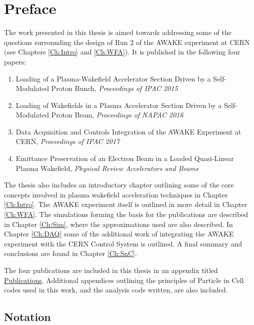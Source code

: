\chapter*{Preface}

The work presented in this thesis is aimed towards addressing some of the questions surrounding the design of Run 2 of the AWAKE experiment at CERN (see Chapters \ref{Ch:Intro} and \ref{Ch:WFA}). It is published in the following four papers:

\begin{enumerate}[I]
    \item Loading of a Plasma-Wakefield Accelerator Section Driven by a Self-Modulated Proton Bunch, \emph{Proceedings of IPAC 2015} \cite{berglyd_olsen:2015}
    \item Loading of Wakefields in a Plasma Accelerator Section Driven by a Self-Modulated Proton Beam, \emph{Proceedings of NAPAC 2016} \cite{berglyd_olsen:2016}
    \item Data Acquisition and Controls Integration of the AWAKE Experiment at CERN, \emph{Proceedings of IPAC 2017} \cite{berglyd_olsen:2017}
    \item Emittance Preservation of an Electron Beam in a Loaded Quasi-Linear Plasma Wakefield, \emph{Physical Review Accelerators and Beams} \cite{berglyd_olsen:2017-1}
\end{enumerate}

The thesis also includes an introductory chapter outlining some of the core concepts involved in plasma wakefield acceleration techniques in Chapter \ref{Ch:Intro}. The AWAKE experiment itself is outlined in more detail in Chapter \ref{Ch:WFA}. The simulations forming the basis for the publications are described in Chapter \ref{Ch:Sim}, where the approximations used are also described. In Chapter \ref{Ch:DAQ} some of the additional work of integrating the AWAKE experiment with the CERN Control System is outlined. A final summary and conclusions are found in Chapter \ref{Ch:SnC}.

\noindent The four publications are included in this thesis in an appendix titled \hyperref[A:Pub]{Publications}. Additional appendices outlining the principles of Particle in Cell codes used in this work, and the analysis code written, are also included.

\newpage
\section*{Notation}

